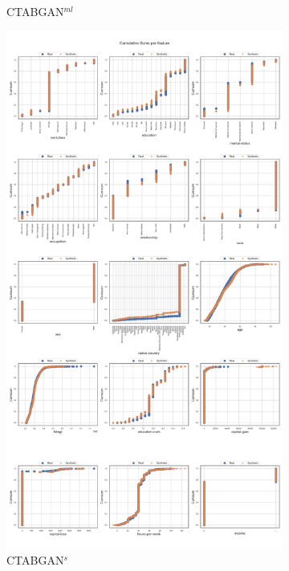 \begin{landscape}
\begin{figure}[h]
\begin{subfigure}{0.3\linewidth}
			\caption{CTABGAN$^{ml}$}
		\end{subfigure}
		\hfill
		\begin{subfigure}{0.3\linewidth}
			\includegraphics[height=\textheight,width=\linewidth,keepaspectratio]{images/cumsums/ctabgan_simTune.jpg}
			\caption{CTABGAN$^s$}
		\end{subfigure}	
		\hfill
		\begin{subfigure}{0.3\linewidth}

\end{subfigure}
\end{figure}
\end{landscape}
